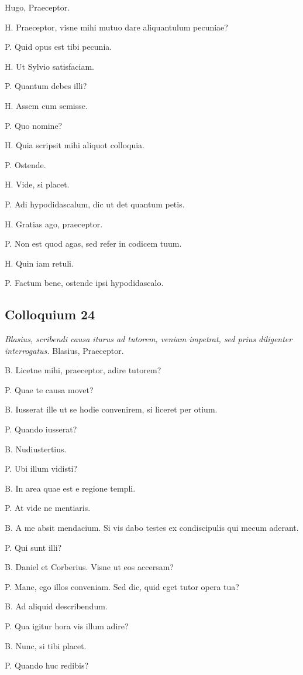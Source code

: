\documentclass{article}
\begin{document}
Hugo, Praeceptor.

H. Praeceptor, visne mihi mutuo dare aliquantulum pecuniae?

P. Quid opus est tibi pecunia.

H. Ut Sylvio satisfaciam.

P. Quantum debes illi?

H. Assem cum semisse.

P. Quo nomine?

H. Quia scripsit mihi aliquot colloquia.

P. Ostende.

H. Vide, si placet.

P. Adi hypodidascalum, dic ut det quantum petis.

H. Gratias ago, praeceptor.

P. Non est quod agas, sed refer in codicem tuum.

H. Quin iam retuli.

P. Factum bene, ostende ipsi hypodidascalo.

\subsection{Colloquium 24}
\emph{Blasius, scribendi causa iturus ad tutorem, veniam impetrat, sed prius diligenter interrogatus.}
Blasius, Praeceptor.

B. Licetne mihi, praeceptor, adire tutorem?

P. Quae te causa movet?

B. Iusserat ille ut se hodie convenirem, si liceret per otium.

P. Quando iusserat?

B. Nudiustertius.

P. Ubi illum vidisti?

B. In area quae est e regione templi.

P. At vide ne mentiaris.

B. A me absit mendacium. Si vis dabo testes ex condiscipulis qui mecum aderant.

P. Qui sunt illi?

B. Daniel et Corberius. Visne ut eos accersam?

P. Mane, ego illos conveniam. Sed dic, quid eget tutor opera tua?

B. Ad aliquid describendum.

P. Qua igitur hora vis illum adire?

B. Nunc, si tibi placet.

P. Quando huc redibis?
\end{document}
